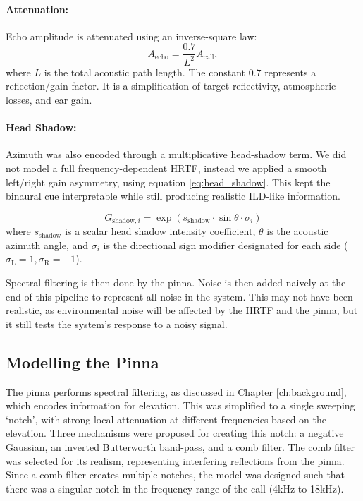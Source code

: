 \paragraph{Attenuation:} Echo amplitude is attenuated using an inverse-square law:
\begin{equation}
    A_{\text{echo}} = \frac{0.7}{L^2}A_{\text{call}},
\end{equation}
where $L$ is the total acoustic path length. The constant $0.7$ represents a reflection/gain factor. It is a simplification of target reflectivity, atmospheric losses, and ear gain.

\paragraph{Head Shadow:} Azimuth was also encoded through a multiplicative head-shadow term. We did not model a full frequency-dependent HRTF, instead we applied a smooth left/right gain asymmetry, using equation \ref{eq:head_shadow}. This kept the binaural cue interpretable while still producing realistic ILD-like information.

\begin{equation}
    G_{\text{shadow}, i} = \exp\left( s_{\text{shadow}} \cdot \sin \theta \cdot \sigma_i \right)
\label{eq:head_shadow}
\end{equation}
where $s_{\text{shadow}}$ is a scalar head shadow intensity coefficient, $\theta$ is the acoustic azimuth angle, and $\sigma_i$ is the directional sign modifier designated for each side ($\sigma_{\text{L}} = 1, \sigma_{\text{R}} = -1$).

Spectral filtering is then done by the pinna. Noise is then added naively at the end of this pipeline to represent all noise in the system. This may not have been realistic, as environmental noise will be affected by the HRTF and the pinna, but it still tests the system's response to a noisy signal.

\subsection{Modelling the Pinna} 

The pinna performs spectral filtering, as discussed in Chapter \ref{ch:background}, which encodes information for elevation. This was simplified to a single sweeping `notch', with strong local attenuation at different frequencies based on the elevation. Three mechanisms were proposed for creating this notch: a negative Gaussian, an inverted Butterworth band-pass, and a comb filter. The comb filter was selected for its realism, representing interfering reflections from the pinna. Since a comb filter creates multiple notches, the model was designed such that there was a singular notch in the frequency range of the call (4kHz to 18kHz).

